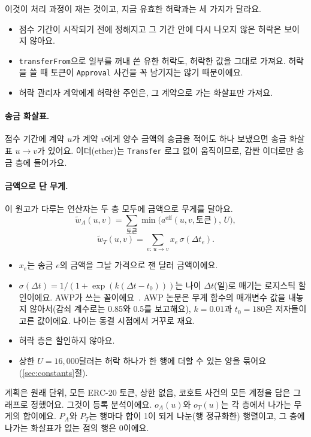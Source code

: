 이것이 처리 과정이 재는 것이고, 지금 유효한 허락과는 세 가지가 달라요.
\begin{itemize}
\item 점수 기간이 시작되기 전에 정해지고 그 기간 안에 다시 나오지 않은 허락은 보이지 않아요.
\item \texttt{transferFrom}으로 일부를 꺼내 쓴 유한 허락도, 허락한 값을 그대로 가져요. 허락을 쓸 때 토큰이 \texttt{Approval} 사건을 꼭 남기지는 않기 때문이에요.
\item 허락 관리자 계약에게 허락한 주인은, 그 계약으로 가는 화살표만 가져요.
\end{itemize}

\paragraph{송금 화살표.}
점수 기간에 계약 $u$가 계약 $v$에게 양수 금액의 송금을 적어도 하나 보냈으면 송금 화살표 $u\to v$가 있어요. 이더(ether)는 \texttt{Transfer} 로그 없이 움직이므로, 감싼 이더로만 송금 층에 들어가요.

\paragraph{금액으로 단 무게.}
이 원고가 다루는 연산자는 두 층 모두에 금액으로 무게를 달아요.
\begin{equation}
\tilde w_A(u,v)=\sum_{\text{토큰}} \min\bigl(a^{\mathrm{eff}}(u,v,\text{토큰}),\,U\bigr),
\label{eq:layerA}
\end{equation}
\begin{equation}
\tilde w_T(u,v)=\sum_{e:\,u\to v} x_e\,\sigma(\Delta t_e).
\label{eq:layerT}
\end{equation}
\begin{itemize}
\item $x_e$는 송금 $e$의 금액을 그날 가격으로 잰 달러 금액이에요.
\item $\sigma(\Delta t)=1/(1+\exp(k(\Delta t-t_0)))$는 나이 $\Delta t$(일)로 매기는 로지스틱 할인이에요. AWP가 쓰는 꼴이에요~\cite{do2023awp}. AWP 논문은 무게 함수의 매개변수 값을 내놓지 않아서(감쇠 계수로는 0.85와 0.5를 보고해요), $k=0.01$과 $t_0=180$은 저자들이 고른 값이에요. 나이는 동결 시점에서 거꾸로 재요.
\item 허락 층은 할인하지 않아요.
\item 상한 $U=16{,}000$달러는 허락 하나가 한 행에 더할 수 있는 양을 묶어요(\ref{sec:constants}절).
\end{itemize}
계획은 원래 단위, 모든 ERC-20 토큰, 상한 없음, 코호트 사건의 모든 계정을 담은 그래프로 정했어요. 그것이 등록 분석이에요. $o_A(u)$와 $o_T(u)$는 각 층에서 나가는 무게의 합이에요. $P_A$와 $P_T$는 행마다 합이 1이 되게 나눈(행 정규화한) 행렬이고, 그 층에 나가는 화살표가 없는 점의 행은 0이에요.

